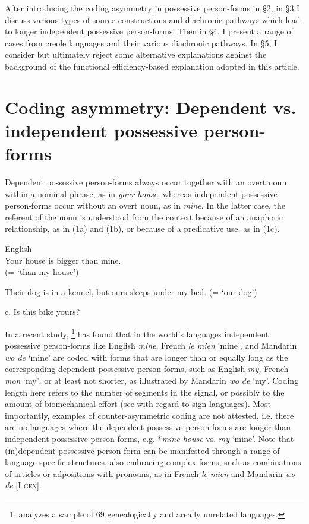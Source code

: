 \documentclass[output=paper]{langsci/langscibook}
\begin{document}
After introducing the coding asymmetry in possessive person-forms in §2, in §3 I discuss various types of source constructions and diachronic pathways which lead to longer independent possessive person-forms. Then in §4, I present a range of cases from creole languages and their various diachronic pathways. In §5, I consider but ultimately reject some alternative explanations against the background of the functional efficiency-based explanation adopted in this article. 

\section{Coding asymmetry: Dependent vs. independent possessive person-forms} 

Dependent possessive person-forms always occur together with an overt noun within a nominal phrase, as in \textit{your house}, whereas independent possessive person-forms occur without an overt noun, as in \textit{mine}. In the latter case, the referent of the noun is understood from the context because of an anaphoric relationship, as in (1a) and (1b), or because of a predicative use, as in (1c).  

\ea
{English}\\
\ea Your house is bigger than mine. \\
\glt (= ‘than my house’)

\ex Their dog is in a kennel, but ours sleeps under my bed. (= ‘our dog’)

\ex c. Is this bike yours?\\
\z
\z

In a recent study, \citet{Ye2017}{\-}\footnote{\citet{Ye2017} analyzes a sample of 69 genealogically and areally unrelated languages.} has found that in the world's languages independent possessive person-forms like English \textit{mine}, French \textit{le mien} `mine', and Mandarin \textit{wo de} `mine' are coded with forms that are longer than or equally long as the corresponding dependent possessive person-forms, such as English \textit{my,} French \textit{mon} `my', or at least not shorter, as illustrated by Mandarin \textit{wo de} `my'. Coding length here refers to the number of segments in the signal, or possibly to the amount of biomechanical effort (see \citealt{NapoliEtAl2014} with regard to sign languages). Most importantly, examples of counter-asymmetric coding are not attested, i.e. there are no languages where the dependent possessive person-forms are longer than independent possessive person-forms, e.g. *\textit{mine house} vs. \textit{my} `mine'. Note that (in)dependent possessive person-form can be manifested through a range of language-specific structures, also embracing complex forms, such as combinations of articles or adpositions with pronouns, as in French \textit{le mien} and Mandarin \textit{wo de} [I \textsc{gen}]. 
\end{document}
